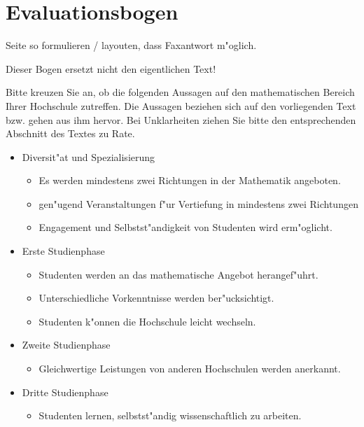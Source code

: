 \section{Evaluationsbogen}

\begin{komacmt}
Seite so formulieren / layouten, dass Faxantwort m"oglich.

Dieser Bogen ersetzt nicht den eigentlichen Text!
\end{komacmt}

Bitte kreuzen Sie an, ob die folgenden Aussagen auf den mathematischen Bereich Ihrer Hochschule zutreffen.
Die Aussagen beziehen sich auf den vorliegenden Text bzw. gehen aus ihm hervor.
Bei Unklarheiten ziehen Sie bitte den entsprechenden Abschnitt des Textes zu Rate.

\begin{itemize}
\item Diversit"at und Spezialisierung
 \begin{itemize}
 \item Es werden mindestens zwei Richtungen in der Mathematik angeboten.
 \item gen"ugend Veranstaltungen f"ur Vertiefung in mindestens zwei Richtungen
 \item Engagement und Selbstst"andigkeit von Studenten wird erm"oglicht.
 \end{itemize}

\item Erste Studienphase
 \begin{itemize}
 \item Studenten werden an das mathematische Angebot herangef"uhrt.
 \item Unterschiedliche Vorkenntnisse werden ber"ucksichtigt.
 \item Studenten k"onnen die Hochschule leicht wechseln.
 \end{itemize}

\item Zweite Studienphase
 \begin{itemize}
 \item Gleichwertige Leistungen von anderen Hochschulen werden anerkannt.
 \end{itemize}

\item Dritte Studienphase
 \begin{itemize}
 \item Studenten lernen, selbstst"andig wissenschaftlich zu arbeiten.
 \end{itemize}


\end{itemize}
